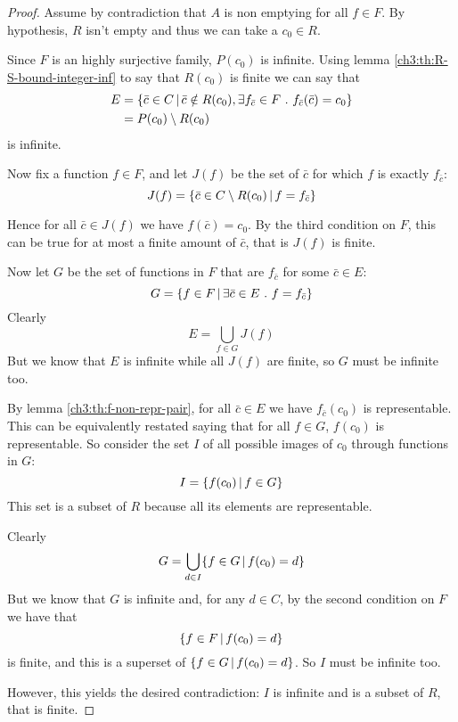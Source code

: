 \begin{proof}
	Assume by contradiction that $A$ is non emptying for all $f \in F$. By hypothesis, $R$ isn't empty and thus we can take a $c_0 \in R$.

	Since $F$ is an highly surjective family, $P(c_0)$ is infinite. Using lemma \ref{ch3:th:R-S-bound-integer-inf} to say that $R(c_0)$ is finite we can say that
	\begin{align*}
		E &= \{ \bar{c} \in C \,\vert\, \bar{c} \notin R(c_0), \exists f_{\bar{c}} \in F\ .\ f_{\bar{c}}(\bar{c}) = c_0 \} \\
		&= P(c_0) \setminus R(c_0)
	\end{align*}
	is infinite.

	Now fix a function $f \in F$, and let $J(f)$ be the set of $\bar{c}$ for which $f$ is exactly $f_{\bar{c}}$:
	\[
	J(f) = \{ \bar{c} \in C \setminus R(c_0) \,\vert\, f = f_{\bar{c}} \}
	\]

	Hence for all $\bar{c} \in J(f)$ we have $f(\bar{c}) = c_0$. By the third condition on $F$, this can be true for at most a finite amount of $\bar{c}$, that is $J(f)$ is finite.

	Now let $G$ be the set of functions in $F$ that are $f_{\bar{c}}$ for some $\bar{c} \in E$:
	\[
	G = \{ f \in F \,\vert\, \exists \bar{c} \in E\ .\ f = f_{\bar{c}} \}
	\]
	Clearly
	\[
	E = \bigcup\limits_{f \in G} J(f)
	\]
	But we know that $E$ is infinite while all $J(f)$ are finite, so $G$ must be infinite too.

	By lemma \ref{ch3:th:f-non-repr-pair}, for all $\bar{c} \in E$ we have $f_{\bar{c}}(c_0)$ is representable. This can be equivalently restated saying that for all $f \in G$, $f(c_0)$ is representable.
	So consider the set $I$ of all possible images of $c_0$ through functions in $G$:
	\[
	I = \{ f(c_0) \,\vert\, f \in G \}
	\]
	This set is a subset of $R$ because all its elements are representable.

	Clearly
	\[
	G = \bigcup\limits_{d \in I} \{ f \in G \,\vert\, f(c_0) = d \}
	\]
	But we know that $G$ is infinite and, for any $d \in C$, by the second condition on $F$ we have that
	\[
	\{ f \in F \,\vert\, f(c_0) = d \}
	\]
	is finite, and this is a superset of $\{ f \in G \,\vert\, f(c_0) = d \}$. So $I$ must be infinite too.

	However, this yields the desired contradiction: $I$ is infinite and is a subset of $R$, that is finite.
\end{proof}

